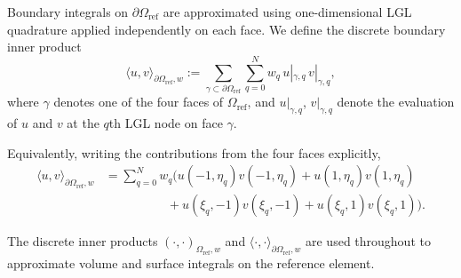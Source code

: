 \documentclass[fleqn,11pt]{amsart}
\begin{document}
Boundary integrals on $\partial\Omega_{\mathrm{ref}}$ are approximated using
one-dimensional LGL quadrature applied independently on each face.
We define the discrete boundary inner product
\begin{equation}
\langle u, v \rangle_{\partial\Omega_{\mathrm{ref}},w}
:=
\sum_{\gamma \subset \partial\Omega_{\mathrm{ref}}}
\sum_{q=0}^{N}
w_q \,
u|_{\gamma,q} \, v|_{\gamma,q},
\label{eq:boundary_inner_product}
\end{equation}
where $\gamma$ denotes one of the four faces of $\Omega_{\mathrm{ref}}$, and
$u|_{\gamma,q}$, $v|_{\gamma,q}$ denote the evaluation of $u$ and $v$ at the
$q$th LGL node on face $\gamma$.


Equivalently, writing the contributions from the four faces explicitly,
\begin{align}
\langle u, v \rangle_{\partial\Omega_{\mathrm{ref}},w}
&=
\sum_{q=0}^{N} w_q \Big(
u(-1,\eta_q)v(-1,\eta_q)
+u(1,\eta_q)v(1,\eta_q)
\nonumber\\
&\qquad\qquad\quad
+u(\xi_q,-1)v(\xi_q,-1)
+u(\xi_q,1)v(\xi_q,1)
\Big).
\label{eq:boundary_inner_product_explicit}
\end{align}



The discrete inner products
$(\cdot,\cdot)_{\Omega_{\mathrm{ref}},w}$ and
$\langle\cdot,\cdot\rangle_{\partial\Omega_{\mathrm{ref}},w}$
are used throughout to approximate volume and surface integrals on the
reference element.



\end{document}
